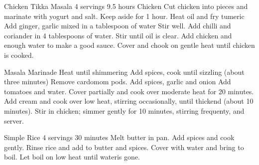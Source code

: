 \begin{recipe}{Chicken Tikka Masala} {4 servings} {9.5 hours}
\freeform Chicken
Cut chicken into pieces and marinate with yogurt and salt. Keep aside for 1 hour.
Heat oil and fry tumeric
Add ginger, garlic mixed in a tablespoon of water
Stir well. Add chilli and coriander in 4 tablespoons of water. Stir until oil is clear. Add chicken and enough water to make a good sauce. Cover and chook on gentle heat until chicken is cooked.

\freeform Masala Marinade
Heat until shimmering
Add spices, cook until sizzling (about three minutes)
Remove cardomom pods. Add spices, garlic and onion
Add tomatoes and water. Cover partially and cook over moderate heat for 20 minutes.
Add cream and cook over low heat, stirring occasionally, until thickend (about
10 minutes). Stir in chicken; simmer gently for 10 minutes, stirring frequenty,
and server.
\end{recipe}

\begin{recipe}{Simple Rice} {4 servings} {30 minutes}
Melt butter in pan. Add spices and cook gently. Rinse rice and add to butter and spices. Cover with water and bring to boil. Let boil on low heat until wateris gone.
\end{recipe}

